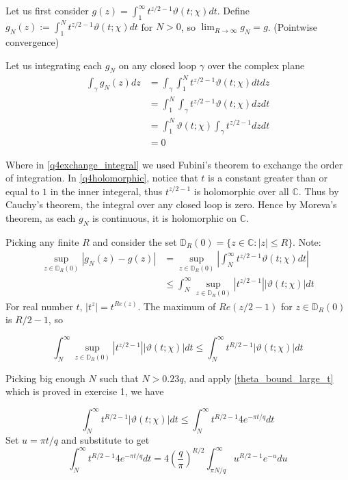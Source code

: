 \documentclass{article}
\theoremstyle{definition}
\theoremstyle{definition}
\theoremstyle{remark}
\newcommand{\D}{\mathbb{D}_R(0)}
\newcommand{\bb}[1]{\mathbb{#1}} %
\begin{document}
Let us first consider 
$
g (z) = \int_1^{\infty} t^{z/2-1}\vartheta(t;\chi) dt.
$
Define $g_N (z) := \int_1^{N} t^{z/2-1}\vartheta(t;\chi) dt $ for $N > 0$, so 
$\lim_{R \rightarrow \infty} g_N = g$. (Pointwise convergence)

Let us integrating each $g_N$ on any closed loop $\gamma$ over the complex plane  
\begin{align}
	\int_{\gamma} g_N(z) dz 
	&= \int_{\gamma} \int_1^{N} t^{z/2-1}\vartheta(t;\chi) dt dz 
	\label{q4exchange_integral}
	\\
	&= \int_1^{N} \int_{\gamma}  t^{z/2-1}\vartheta(t;\chi) dz dt 
	\\
	\label{q4holomorphic}
	&= \int_1^{N} \vartheta(t;\chi) \int_{\gamma}  t^{z/2-1} dz dt 
	\\
	&= 0
\end{align}

Where in \eqref{q4exchange_integral} we used Fubini's theorem to exchange the order of integration. 
In \eqref{q4holomorphic}, notice that $t$ is a constant greater than or equal to $1$ in the inner integeral, thus $t^{z/2 - 1}$ is holomorphic over all $\bb{C}$. 
Thus by Cauchy's theorem, the integral over any closed loop is zero.
Hence by Moreva's theorem, as each $g_N$ is continuous, it is holomorphic on $\mathbb{C}$.

Picking any finite $R$ and consider the set $\D = \{z \in \bb{C}: |z| \leq R\}$.
Note:
\begin{align}
	\sup_{z \in \D} |g_N(z) - g(z)|
	& = \sup_{z \in \D} \left| \int_{N}^{\infty} t^{z/2-1}\vartheta(t;\chi) dt \right| \\
	&\leq \int_{N}^{\infty} \sup_{z \in \D} \left| t^{z/2-1} \right| |\vartheta(t;\chi) | dt 
\end{align}
For real number $t$, $|t^z| = t^{Re(z)}$. The maximum of $Re(z/2 -1)$ for $z \in \D$ is $R/2 - 1$, so 

$$
	\int_{N}^{\infty} \sup_{z \in \D} \left| t^{z/2-1} \right| |\vartheta(t;\chi) | dt 
	\leq
	\int_{N}^{\infty} t^{R/2-1}  |\vartheta(t;\chi) | dt 
$$

Picking big enough $N$ such that $N > 0.23q$, and apply \eqref{theta_bound_large_t} which is proved in exercise 1, we have

$$
	\int_{N}^{\infty} t^{R/2-1}  |\vartheta(t;\chi) | dt 
	\leq
	\int_{N}^{\infty} t^{R/2-1}  4e^{-\pi t /q} dt 
$$
Set $u = \pi t / q$ and substitute to get 
$$
	\int_{N}^{\infty} t^{R/2-1}  4e^{-\pi t /q} dt 
	= 4 \left(\frac{q}{\pi}\right)^{R/2}\int^{\infty}_{\pi N / q} u^{R/2-1} e^{-u} du
$$
\end{document}
